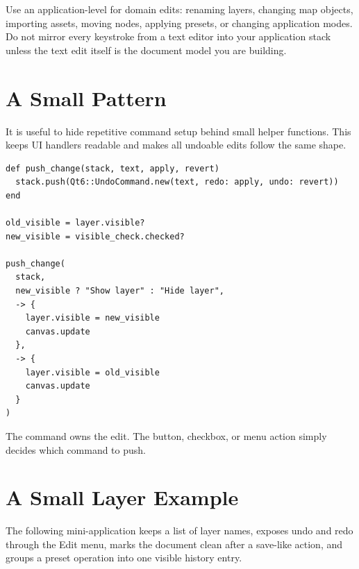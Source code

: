 Use an application-level  for domain edits: renaming layers, changing map objects, importing assets, moving nodes, applying presets, or changing application modes. Do not mirror every keystroke from a text editor into your application stack unless the text edit itself is the document model you are building.

\section{A Small Pattern}

It is useful to hide repetitive command setup behind small helper functions. This keeps UI handlers readable and makes all undoable edits follow the same shape.

\begin{lstlisting}[style=crystal]
def push_change(stack, text, apply, revert)
  stack.push(Qt6::UndoCommand.new(text, redo: apply, undo: revert))
end

old_visible = layer.visible?
new_visible = visible_check.checked?

push_change(
  stack,
  new_visible ? "Show layer" : "Hide layer",
  -> {
    layer.visible = new_visible
    canvas.update
  },
  -> {
    layer.visible = old_visible
    canvas.update
  }
)
\end{lstlisting}

The command owns the edit. The button, checkbox, or menu action simply decides which command to push.

\section{A Small Layer Example}

The following mini-application keeps a list of layer names, exposes undo and redo through the Edit menu, marks the document clean after a save-like action, and groups a preset operation into one visible history entry.

